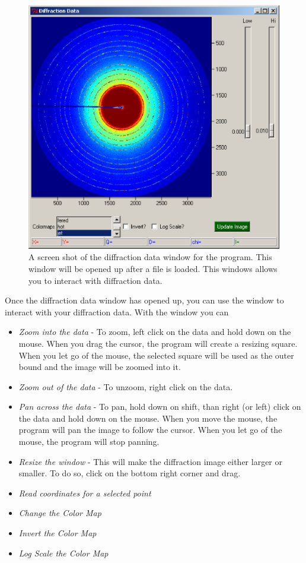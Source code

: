 \begin{figure}
    \centering
    \includegraphics[scale=.75]{figures/diffraction_data_window.eps}
    \caption{A screen shot of the diffraction data window for
    the program. This window will be opened up after a file is 
    loaded. This windows allows you to interact with diffraction 
    data.} 
    \label{diffraction_data_window}
\end{figure}


Once the diffraction data window has opened up, you can use
the window to interact with your diffraction data. With
the window you can
\begin{itemize}
    \item {\em Zoom into the data} - To zoom, left click on
    the data and hold down on the mouse. When you drag the cursor, 
    the program will create a resizing square. When you let go of the
    mouse, the selected square will be used as the outer bound and
    the image will be zoomed into it.
    \item {\em Zoom out of the data} - To unzoom, right click on
    the data.
    \item {\em Pan across the data} - To pan, hold down on shift, than
    right (or left) click on the data and hold down on the mouse. When 
    you move the mouse, the program will pan the image to follow the 
    cursor. When you let go of the mouse, the program will stop panning.
    \item {\em Resize the window} - This will make the diffraction
    image either larger or smaller. To do so, click on the bottom 
    right corner and drag.
    \item {\em Read coordinates for a selected point}
    \item {\em Change the Color Map}
    \item {\em Invert the Color Map}
    \item {\em Log Scale the Color Map}
\end{itemize}


